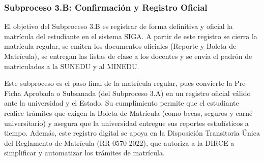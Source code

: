 \subsubsection{Subproceso 3.B: Confirmación y Registro Oficial}

El objetivo del Subproceso 3.B es registrar de forma definitiva y oficial la matrícula del estudiante en el sistema SIGA. A partir de este registro se cierra la matrícula regular, se emiten los documentos oficiales (Reporte y Boleta de Matrícula), se entregan las listas de clase a los docentes y se envía el padrón de matriculados a la SUNEDU y al MINEDU.

Este subproceso es el paso final de la matrícula regular, pues convierte la Pre-Ficha Aprobada o Subsanada (del Subproceso 3.A) en un registro oficial válido ante la universidad y el Estado. Su cumplimiento permite que el estudiante realice trámites que exigen la Boleta de Matrícula (como becas, seguros y carné universitario) y asegura que la universidad entregue sus reportes estadísticos a tiempo. Además, este registro digital se apoya en la Disposición Transitoria Única del Reglamento de Matrícula (RR-0570-2022), que autoriza a la DIRCE a simplificar y automatizar los trámites de matrícula.
